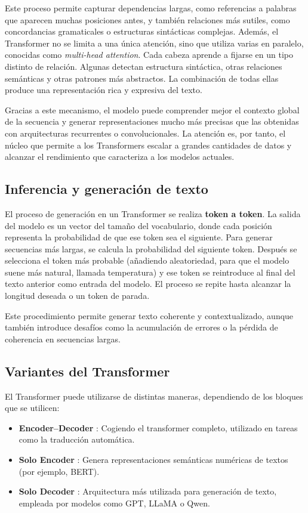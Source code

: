 Este proceso permite capturar dependencias largas, como referencias a palabras que aparecen muchas posiciones antes, y también relaciones más sutiles, como concordancias gramaticales o estructuras sintácticas complejas. Además, el Transformer no se limita a una única atención, sino que utiliza varias en paralelo, conocidas como \textit{multi-head attention}. Cada cabeza aprende a fijarse en un tipo distinto de relación. Algunas detectan estructura sintáctica, otras relaciones semánticas y otras patrones más abstractos. La combinación de todas ellas produce una representación rica y expresiva del texto.

Gracias a este mecanismo, el modelo puede comprender mejor el contexto global de la secuencia y generar representaciones mucho más precisas que las obtenidas con arquitecturas recurrentes o convolucionales. La atención es, por tanto, el núcleo que permite a los Transformers escalar a grandes cantidades de datos y alcanzar el rendimiento que caracteriza a los modelos actuales.


\subsection{Inferencia y generación de texto}

El proceso de generación en un Transformer se realiza \textbf{token a token}. La salida del modelo es un vector del tamaño del vocabulario, donde cada posición representa la probabilidad de que ese token sea el siguiente. Para generar secuencias más largas, se calcula la probabilidad del siguiente token. Después se selecciona el token más probable (añadiendo aleatoriedad, para que el modelo suene más natural, llamada temperatura) y ese token se reintroduce al final del texto anterior como entrada del modelo. El proceso se repite hasta alcanzar la longitud deseada o un token de parada.

Este procedimiento permite generar texto coherente y contextualizado, aunque también introduce desafíos como la acumulación de errores o la pérdida de coherencia en secuencias largas.


\subsection{Variantes del Transformer}

El Transformer puede utilizarse de distintas maneras, dependiendo de los bloques que se utilicen:

\begin{itemize}
    \item \textbf{Encoder–Decoder} \cite{vaswani2023attentionneed}: Cogiendo el transformer completo, utilizado en tareas como la traducción automática.
    \item \textbf{Solo Encoder} \cite{devlin2019bert}: Genera representaciones semánticas numéricas de textos (por ejemplo, BERT).
    \item \textbf{Solo Decoder} \cite{brown2020language}: Arquitectura más utilizada para generación de texto, empleada por modelos como GPT, LLaMA o Qwen.
\end{itemize}

